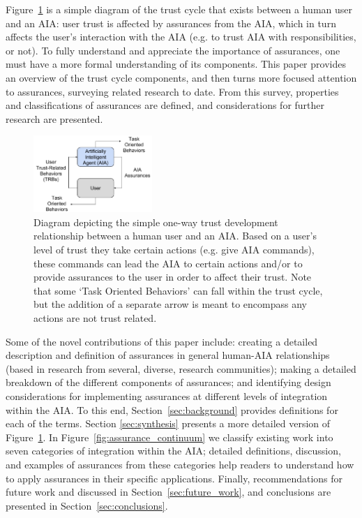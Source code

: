 Figure~\ref{fig:SimpleTrust_one_way} is a simple diagram of the trust cycle that exists between a human user and an AIA: user trust is affected by assurances from the AIA, which in turn affects the user's interaction with the AIA (e.g. to trust AIA with responsibilities, or not). To fully understand and appreciate the importance of assurances, one must have a more formal understanding of its components. This paper provides an overview of the trust cycle components, and then turns more focused attention to assurances, surveying related research to date. From this survey, properties and classifications of assurances are defined, and considerations for further research are presented. 
%
\begin{figure}
    \centering
    \includegraphics[width=0.4\textwidth]{Figures/SimpleTrust_one_way}
    \caption{Diagram depicting the simple one-way trust development relationship between a human user and an AIA. Based on a user's level of trust they take certain actions (e.g. give AIA commands), these commands can lead the AIA to certain actions and/or to provide assurances to the user in order to affect their trust. Note that some `Task Oriented Behaviors' can fall within the trust cycle, but the addition of a separate arrow is meant to encompass any actions are not trust related.}
    \label{fig:SimpleTrust_one_way}
\end{figure}
%
Some of the novel contributions of this paper include: creating a detailed description and definition of assurances in general human-AIA relationships (based in research from several, diverse, research communities); making a detailed breakdown of the different components of assurances; and identifying design considerations for implementing assurances at different levels of integration within the AIA. To this end, Section~\ref{sec:background} provides definitions for each of the terms. Section \ref{sec:synthesis} presents a more detailed version of Figure~\ref{fig:SimpleTrust_one_way}. In Figure~\ref{fig:assurance_continuum} we classify existing work into seven categories of integration within the AIA; detailed definitions, discussion, and examples of assurances from these categories help readers to understand how to apply assurances in their specific applications. Finally, recommendations for future work and discussed in Section~\ref{sec:future_work}, and conclusions are presented in Section~\ref{sec:conclusions}.
